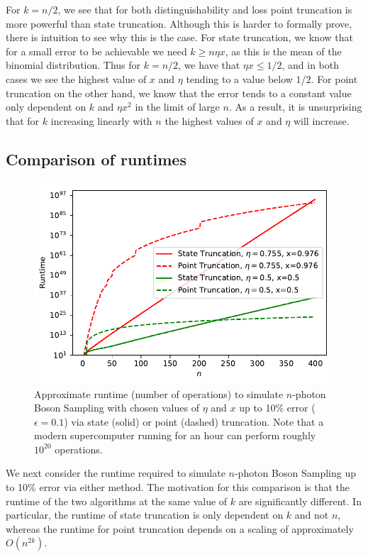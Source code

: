 For $k=n/2$, we see that for both distinguishability and loss point truncation is more powerful than state truncation. 
Although this is harder to formally prove, there is intuition to see why this is the case. 
For state truncation, we know that for a small error to be achievable we need $k\geq n\eta x$, as this is the mean of the binomial distribution. 
Thus for $k=n/2$, we have that $\eta x \leq 1/2$, and in both cases we see the highest value of $x$ and $\eta$ tending to a value below $1/2$. 
For point truncation on the other hand, we know that the error tends to a constant value only dependent on $k$ and $\eta x^2$ in the limit of large $n$. 
As a result, it is unsurprising that for $k$ increasing linearly with $n$ the highest values of $x$ and $\eta$ will increase.


\subsection{Comparison of runtimes}
\label{subsec:runtimes}

\begin{figure}
\begin{center}
\includegraphics[width=0.5\linewidth]{classical_sim/runtime}
\end{center}
\caption[Approximate runtime to simulate $n$-photon Boson Sampling with chosen values of $\eta$ and $x$ via state or point truncation]{\label{fig:runtime} Approximate runtime (number of operations) to simulate $n$-photon Boson Sampling with chosen values of $\eta$ and $x$ up to 10\% error ($\epsilon=0.1$) via state (solid) or point (dashed) truncation. Note that a modern supercomputer running for an hour can perform roughly $10^{20}$ operations.}
\end{figure}

We next consider the runtime required to simulate $n$-photon Boson Sampling up to 10\% error via either method. 
The motivation for this comparison is that the runtime of the two algorithms at the same value of $k$ are significantly different. 
In particular, the runtime of state truncation is only dependent on $k$ and not $n$, whereas the runtime for point truncation depends on a scaling of approximately $O(n^{2k})$.

